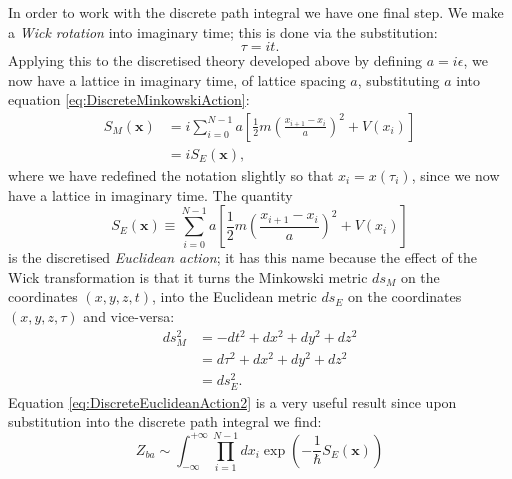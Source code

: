 \documentclass[12pt]{article}
\begin{document}
        In order to work with the discrete path integral we have one final step. We make a \textit{Wick rotation} into imaginary time; this is done via the substitution:
        \begin{equation}
            \label{eq:WickRotation}
            \tau = it.
        \end{equation}
        Applying this to the discretised theory developed above by defining $a=i\epsilon$, we now have a lattice in imaginary time, of lattice spacing $a$, substituting $a$ into equation \ref{eq:DiscreteMinkowskiAction}:
        \begin{align}
            \label{eq:DiscreteEuclideanAction1}
            S_M\left(\bm{x}\right) & = i\sum_{i=0}^{N-1} a \left[\frac{1}{2}m\left(\frac{x_{i+1}-x_{i}}{a}\right)^2 + V(x_i)\right] \\
            \label{eq:DiscreteEuclideanAction2} & = iS_E\left(\bm{x}\right),
        \end{align}
        where we have redefined the notation slightly so that $x_i=x\left(\tau_i\right)$, since we now have a lattice in imaginary time.
        The quantity
        \begin{equation}
            \label{eq:DiscreteEuclideanAction}
            S_{E}\left(\bm{x}\right) \equiv \sum_{i=0}^{N-1} a \left[\frac{1}{2}m\left(\frac{x_{i+1}-x_{i}}{a}\right)^2 + V(x_i)\right]
        \end{equation}
        is the discretised \textit{Euclidean action}; it has this name because the effect of the Wick transformation is that it turns the Minkowski metric $ds_{M}$ on the coordinates $\left(x,y,z,t\right)$, into the Euclidean metric $ds_{E}$ on the coordinates $\left(x,y,z,\tau\right)$ and vice-versa:
        \begin{align}
            \label{eq:MinkowskiMetric} ds_{M}^{2} & = -dt^2 + dx^2 + dy^2 + dz^2 \\
            \label{eq:MetricTransform}            & = d\tau^2 + dx^2 + dy^2 + dz^2 \\
            \label{eq:EuclideanMetric}            & = ds_{E}^{2}.
        \end{align}
        Equation \ref{eq:DiscreteEuclideanAction2} is a very useful result since upon substitution into the discrete path integral we find:
        \begin{equation}
            \label{eq:DiscreteEuclideanPathIntegral}
            Z_{ba} \sim \int^{+\infty}_{-\infty}\prod_{i=1}^{N-1}dx_i \exp{\left(-\frac{1}{\hbar}S_{E}\left(\bm{x}\right)\right)}
        \end{equation}
\end{document}
